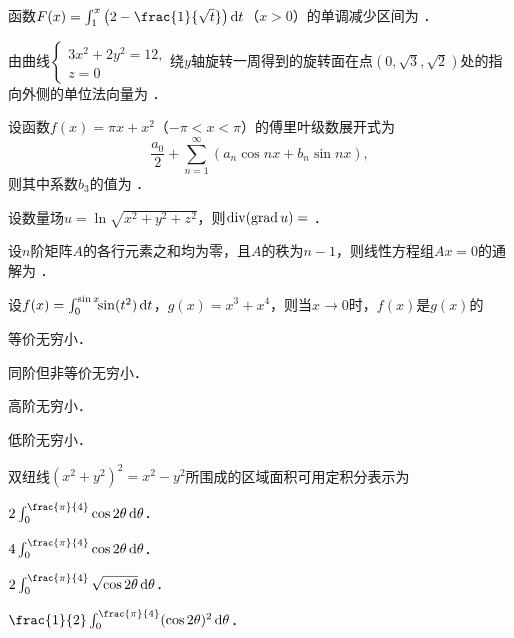 \documentclass[plain,noanswer,medmath]{../../template/jnuexam}
\begin{document}




\begin{problem}
函数$F(x) = \int_1^x \left(2 - \frac{1}{\sqrt{t}} \right)\dt$（$x > 0$）的单调减少区间为 \fillin{}．
\end{problem}


\begin{problem}
由曲线$\begin{cases}
  3x^2 + 2y^2 = 12, \\
  z = 0
\end{cases}$绕$y$轴旋转一周得到的旋转面在点$(0,\sqrt{3},\sqrt{2})$处的指向外侧的单位法向量为 \fillin{}．
\end{problem}


\begin{problem}
设函数$f(x) = \pi x + x^2$（$- \pi < x < \pi$）的傅里叶级数展开式为
$$\frac{a_0}{2} + \sum_{n = 1}^{\infty}(a_n\cos nx + b_n\sin nx),$$
则其中系数$b_3$的值为 \fillin{}．
\end{problem}


\begin{problem}
设数量场$u = \ln \sqrt{x^2 + y^2 + z^2}$，则$\operatorname{div}(\operatorname{grad} u) =$ \fillin{}．
\end{problem}


\begin{problem}
设$n$阶矩阵$A$的各行元素之和均为零，且$A$的秩为$n - 1$，则线性方程组$Ax = 0$的通解为 \fillin{}．
\end{problem}




\begin{problem}
设$f(x) = \int_0^{\sin x} \!\!\sin(t^2)\mathop{}\!\mathrm{d} t$，$g(x) = x^3 + x^4$，则当$x \to 0$时，$f(x)$是$g(x)$的\pickout{}
\begin{abcd}
\item 等价无穷小．				
\item 同阶但非等价无穷小． 
\item 高阶无穷小．				
\item 低阶无穷小．
\end{abcd}
\end{problem}


\begin{problem}
双纽线$(x^2 + y^2)^2 = x^2 - y^2$所围成的区域面积可用定积分表示为\pickout{}
\begin{abcd}
\item $2\int_0^{\frac{\pi}{4}} \cos 2\theta \d\theta$．					
\item $4\int_0^{\frac{\pi}{4}} \cos 2\theta \d\theta$．
\item $2\int_0^{\frac{\pi}{4}} \sqrt{\cos 2\theta} \d\theta$．				
\item $\frac{1}{2}\int_0^{\frac{\pi}{4}} (\cos 2\theta)^2 \d\theta$．
\end{abcd}
\end{problem}
\end{document}
